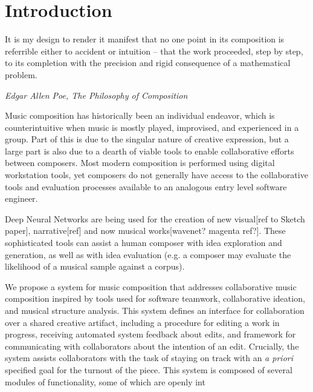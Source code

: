 \documentclass[final,authoryear,5p,times,twocolumn]{elsarticle}
\begin{document}
\section{Introduction}
\label{sec:introduction}

\epigraph{It is my design to render it manifest that no one point in its composition is referrible either to accident or intuition -- that the work proceeded, step by step, to its completion with the precision and rigid consequence of a mathematical problem.}{\textit{Edgar Allen Poe, The Philosophy of Composition}}

Music composition has historically been an individual endeavor, which is counterintuitive when music is
mostly played, improvised, and experienced in a group. Part of this is due to the singular nature of creative 
expression, but a large part is also due to a dearth of viable tools to enable collaborative efforts
between composers. Most modern composition is performed using digital workstation tools, yet composers do not generally have access to the collaborative tools and evaluation processes available to an analogous entry level software engineer.


Deep Neural Networks are being used for the creation of new visual[ref to Sketch paper], narrative[ref] and now musical works[wavenet? magenta ref?]. These sophisticated tools can assist a human composer with idea exploration and generation, as well as with idea evaluation (e.g. a composer may evaluate the likelihood of a musical sample against a corpus).


We propose a system for music composition that addresses collaborative music composition inspired by
tools used for software teamwork, collaborative ideation, and musical structure analysis. This system defines an interface for collaboration over a shared creative artifact, including a procedure for editing a work in progress, receiving automated system feedback about edits, and framework for communicating with collaborators about the intention of an edit. Crucially, the system assists collaborators with the task of staying on track with an \textit{a priori} specified goal for the turnout of the piece. This system is composed of several modules of functionality, some of which are openly int
\end{document}
